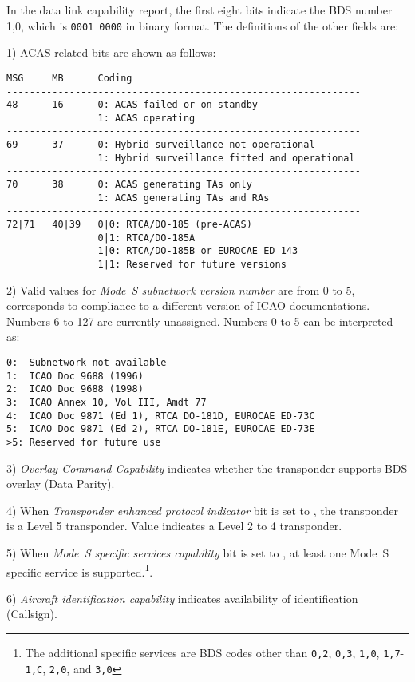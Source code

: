 In the data link capability report, the first eight bits indicate the BDS number 1,0, which is \texttt{0001 0000} in binary format. The definitions of the other fields are:

1) ACAS related bits are shown as follows:

\begin{verbatim}
MSG     MB      Coding
--------------------------------------------------------------
48      16      0: ACAS failed or on standby
                1: ACAS operating
--------------------------------------------------------------
69      37      0: Hybrid surveillance not operational
                1: Hybrid surveillance fitted and operational
--------------------------------------------------------------
70      38      0: ACAS generating TAs only
                1: ACAS generating TAs and RAs
--------------------------------------------------------------
72|71   40|39   0|0: RTCA/DO-185 (pre-ACAS)
                0|1: RTCA/DO-185A
                1|0: RTCA/DO-185B or EUROCAE ED 143
                1|1: Reserved for future versions
\end{verbatim}

2) Valid values for \emph{Mode~S subnetwork version number} are from 0 to 5, corresponds to compliance to a different version of ICAO documentations. Numbers 6 to 127 are currently unassigned. Numbers 0 to 5 can be interpreted as:

\begin{verbatim}
0:  Subnetwork not available
1:  ICAO Doc 9688 (1996)
2:  ICAO Doc 9688 (1998)
3:  ICAO Annex 10, Vol III, Amdt 77
4:  ICAO Doc 9871 (Ed 1), RTCA DO-181D, EUROCAE ED-73C
5:  ICAO Doc 9871 (Ed 2), RTCA DO-181E, EUROCAE ED-73E
>5: Reserved for future use
\end{verbatim}

3) \emph{Overlay Command Capability} indicates whether the transponder supports BDS overlay (Data Parity).

4) When \emph{Transponder enhanced protocol indicator} bit is set to \1, the transponder is a Level 5 transponder. Value \0 indicates a Level 2 to 4 transponder.

5) When \emph{Mode~S specific services capability} bit is set to \1, at least one Mode~S specific service is supported.\footnote{The additional specific services are BDS codes other than \texttt{0,2}, \texttt{0,3}, \texttt{1,0}, \texttt{1,7}-\texttt{1,C}, \texttt{2,0}, and \texttt{3,0}}.

6) \emph{Aircraft identification capability} indicates availability of identification (Callsign).


